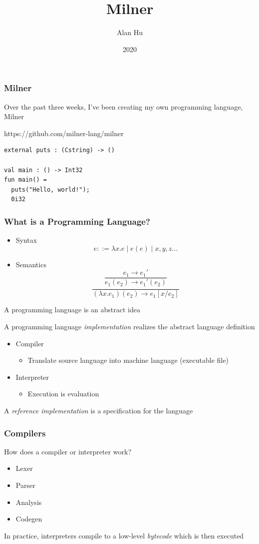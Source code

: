 \documentclass{beamer}
\title{Milner}
\author{Alan Hu}
\date{2020}
\begin{document}
\frame{\titlepage}

\begin{frame}[fragile]
  \frametitle{Milner}
  Over the past three weeks, I've been creating my own programming language,
  Milner \break

  https://github.com/milner-lang/milner \break

\begin{verbatim}
external puts : (Cstring) -> ()

val main : () -> Int32
fun main() =
  puts("Hello, world!");
  0i32
\end{verbatim}
\end{frame}

\begin{frame}
  \frametitle{What is a Programming Language?}
  \begin{itemize}
    \pause
  \item Syntax
    $$
    e ::= \lambda x.e \mid e(e) \mid x, y, z...
    $$
    \pause
  \item Semantics
    $$
    \frac{e_1 \longrightarrow e_1'}{e_1(e_2) \longrightarrow e_1'(e_2)}
    $$
    $$
    \frac{}{(\lambda x.e_1)(e_2) \longrightarrow e_1[x/e_2]}
    $$
  \end{itemize}
  \pause
  A programming language is an abstract idea
\end{frame}

\begin{frame}
  A programming language \textit{implementation} realizes the abstract language
  definition
  \begin{itemize}
    \pause
  \item Compiler
    \begin{itemize}
      \pause
      \item Translate source language into machine language (executable file)
    \end{itemize}
    \pause
  \item Interpreter
    \begin{itemize}
      \pause
    \item Execution is evaluation
    \end{itemize}
  \end{itemize}
  A \textit{reference implementation} is a specification for the language
\end{frame}

\begin{frame}
  \frametitle{Compilers}
  How does a compiler or interpreter work?
  \begin{itemize}
    \pause
  \item Lexer
    \pause
  \item Parser
    \pause
  \item Analysis
    \pause
  \item Codegen
  \end{itemize}
  \pause
  In practice, interpreters compile to a low-level \textit{bytecode} which is
  then executed
\end{frame}
\end{document}
